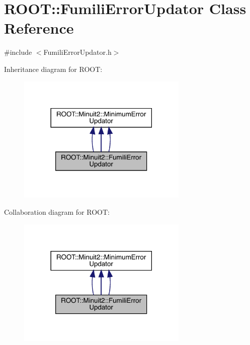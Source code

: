 \hypertarget{classROOT_1_1Minuit2_1_1FumiliErrorUpdator}{}\section{R\+O\+OT\+:\+:Fumili\+Error\+Updator Class Reference}
\label{classROOT_1_1Minuit2_1_1FumiliErrorUpdator}


{\ttfamily \#include $<$Fumili\+Error\+Updator.\+h$>$}



Inheritance diagram for R\+O\+OT\+:
\nopagebreak
\begin{figure}[H]
\begin{center}
\leavevmode
\includegraphics[width=230pt]{d9/d85/classROOT_1_1Minuit2_1_1FumiliErrorUpdator__inherit__graph}
\end{center}
\end{figure}


Collaboration diagram for R\+O\+OT\+:
\nopagebreak
\begin{figure}[H]
\begin{center}
\leavevmode
\includegraphics[width=230pt]{d0/d1b/classROOT_1_1Minuit2_1_1FumiliErrorUpdator__coll__graph}
\end{center}
\end{figure}
